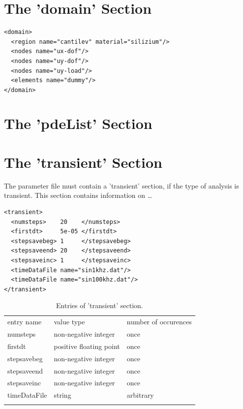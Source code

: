 \documentclass[a4paper]{article}
\newcommand{\mytabspace}{\medskip}
\begin{document}
\section{The 'domain' Section}
%
%
\begin{verbatim}
<domain>
  <region name="cantilev" material="silizium"/>
  <nodes name="ux-dof"/>
  <nodes name="uy-dof"/>
  <nodes name="uy-load"/>
  <elements name="dummy"/>
</domain>
\end{verbatim}
%
%
\section{The 'pdeList' Section}
%
%
\section{The 'transient' Section}
%
%
The parameter file must contain a 'transient' section, if the type of analysis
is transient. This section contains information on \ldots
%
%
\begin{verbatim}
<transient>
  <numsteps>    20    </numsteps>
  <firstdt>     5e-05 </firstdt>
  <stepsavebeg> 1     </stepsavebeg>
  <stepsaveend> 20    </stepsaveend>
  <stepsaveinc> 1     </stepsaveinc>
  <timeDataFile name="sin1khz.dat"/>
  <timeDataFile name="sin100khz.dat"/>
</transient>
\end{verbatim}
%
%
\begin{table}
\caption{\label{tab:TransientSection}Entries of 'transient' section.}
\mytabspace
\centering
\begin{tabular}{lll}
\hline\noalign{\smallskip}
entry name & value type & number of occurences \\
\noalign{\smallskip}\hline\noalign{\smallskip}
numsteps     & non-negative integer    & once \\
firstdt      & positive floating point & once \\
stepsavebeg  & non-negative integer    & once \\
stepsaveend  & non-negative integer    & once \\
stepsaveinc  & non-negative integer    & once \\
timeDataFile & string                  & arbitrary \\
\noalign{\smallskip}\hline
\end{tabular}
\end{table}
\end{document}
